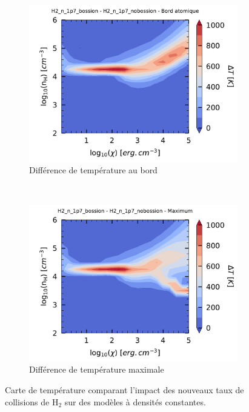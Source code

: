\begin{figure}[!h]
    \centering
    \begin{subfigure}[t]{0.49\textwidth} %
        \centering \includegraphics[trim = {0 0 0 1cm },clip,width=1\textwidth]{figure/H2/diffgrid_bossionglover/mapTba_H2_n_1p7_bossion_H2_n_1p7_nobossion.pdf}
        \caption{Différence de température au bord}
        \label{fig:H2:Bossion:Tba}
    \end{subfigure}
    ~ 
    \begin{subfigure}[t]{0.49\textwidth}
        \centering \includegraphics[trim = {0 0 0 1cm },clip,width=1\textwidth]{figure/H2/diffgrid_bossionglover/mapTmax_H2_n_1p7_bossion_H2_n_1p7_nobossion.pdf}
        \caption{Différence de température maximale}
         \label{fig:H2:Bossion:Tmax}
    \end{subfigure}
    \caption{Carte de température comparant l'impact des nouveaux taux de collisions de $\mathrm{H}_2$ sur des modèles à densités constantes.}
\end{figure}

